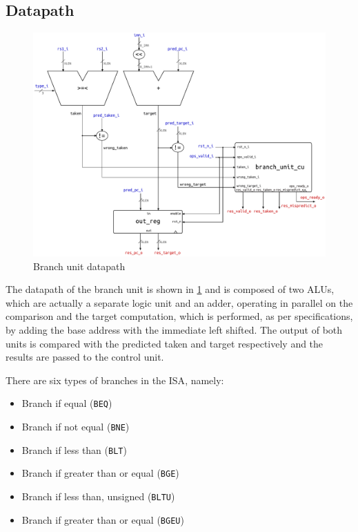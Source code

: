\subsection{Datapath}
\begin{figure}[hbt]
  \centering
  \includegraphics[width=\textwidth]{img/branch_unit.pdf}
  \caption{Branch unit datapath}
  \label{fig:branch_unit}
\end{figure}
The datapath of the branch unit is shown in \cref{fig:branch_unit} and is composed of two \acsp{ALU}, which are actually a separate logic unit and an adder, operating in parallel on the comparison and the target computation, which is performed, as per \riscv specifications, by adding the base address with the immediate left shifted. The output of both units is compared with the predicted taken and target respectively and the results are passed to the control unit.

There are six types of branches in the \riscv \ac{ISA}, namely:
\begin{itemize}
  \item Branch if equal (\texttt{BEQ})
  \item Branch if not equal (\texttt{BNE})
  \item Branch if less than (\texttt{BLT})
  \item Branch if greater than or equal (\texttt{BGE})
  \item Branch if less than, unsigned (\texttt{BLTU})
  \item Branch if greater than or equal (\texttt{BGEU})
\end{itemize}

